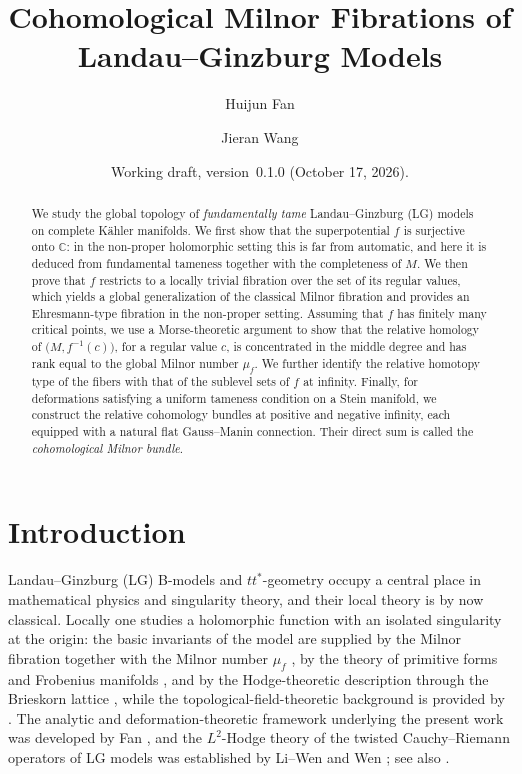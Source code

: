 \documentclass[11pt]{amsart}
\title[Cohomological Milnor Fibrations]{Cohomological Milnor Fibrations of Landau--Ginzburg Models}
\author{Huijun Fan}
\author{Jieran Wang}
\date{Working draft, version~0.1.0 (October 17, 2026).}
\theoremstyle{plain}
\theoremstyle{definition}
\theoremstyle{remark}
\numberwithin{equation}{section}
\begin{document}
\begin{abstract}
    We study the global topology of \emph{fundamentally tame} Landau--Ginzburg (LG) models on complete K\"ahler manifolds.
    We first show that the superpotential $f$ is surjective onto $\mathbb{C}$: in the non-proper holomorphic setting this is far from automatic, and here it is deduced from fundamental tameness together with the completeness of $M$.
    We then prove that $f$ restricts to a locally trivial fibration over the set of its regular values, which yields a global generalization of the classical Milnor fibration and provides an Ehresmann-type fibration in the non-proper setting.
    Assuming that $f$ has finitely many critical points, we use a Morse-theoretic argument to show that the relative homology of $\bigl(M,f^{-1}(c)\bigr)$, for a regular value $c$, is concentrated in the middle degree and has rank equal to the global Milnor number $\mu_f$.
    We further identify the relative homotopy type of the fibers with that of the sublevel sets of $f$ at infinity.
    Finally, for deformations satisfying a uniform tameness condition on a Stein manifold, we construct the relative cohomology bundles at positive and negative infinity, each equipped with a natural flat Gauss--Manin connection.
    Their direct sum is called the \emph{cohomological Milnor bundle}.
\end{abstract}

\maketitle

\section{Introduction}

Landau--Ginzburg (LG) B-models and $tt^*$-geometry occupy a central place in mathematical physics and singularity theory, and their local theory is by now classical.
Locally one studies a holomorphic function with an isolated singularity at the origin: the basic invariants of the model are supplied by the Milnor fibration together with the Milnor number $\mu_f$ \cite{milnor1968singular}, by the theory of primitive forms and Frobenius manifolds \cite{Saito1981Primitive,SaitoTakahashi2008,Hertling2003}, and by the Hodge-theoretic description through the Brieskorn lattice \cite{saito1989brieskorn}, while the topological-field-theoretic background is provided by \cite{CecottiVafa1991,Dubrovin1993,Dubrovin1996}.
The analytic and deformation-theoretic framework underlying the present work was developed by Fan \cite{fan2011,FanFang2021}, and the $L^2$-Hodge theory of the twisted Cauchy--Riemann operators of LG models was established by Li--Wen \cite{LI2022108165} and Wen \cite{Wen2016,WenFan2015}; see also \cite{FanJarvisRuan2013}.
\end{document}
